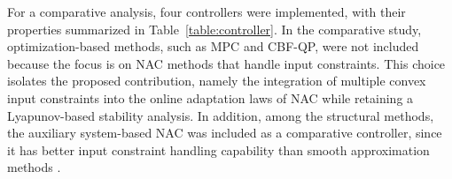 \documentclass[letterpaper, journal]{IEEEtran}
\begin{document}
\hfill


For a comparative analysis, four controllers were implemented, with their properties summarized in Table~\ref{table:controller}.
In the comparative study, optimization-based methods, such as MPC and CBF-QP, were not included because the focus is on NAC methods that handle input constraints.
This choice isolates the proposed contribution, namely the integration of multiple convex input constraints into the online adaptation laws of NAC while retaining a Lyapunov-based stability analysis.
In addition, among the structural methods, the auxiliary system-based NAC was included as a comparative controller, since it has better input constraint handling capability than smooth approximation methods \cite{Min:2021aa}.
\end{document}
